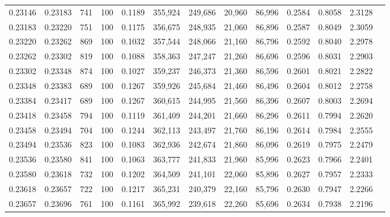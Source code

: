 \begin{tabular}{rrrrrrrrrrrrr}
0.23146 & 0.23183 &   741 & 100 &                                     0.1189 & 355,924 & 249,686 &  20,960 &  86,996 & 0.2584 & 0.8058 & 2.3128 \\
0.23183 & 0.23220 &   751 & 100 &                                     0.1175 & 356,675 & 248,935 &  21,060 &  86,896 & 0.2587 & 0.8049 & 2.3059 \\
0.23220 & 0.23262 &   869 & 100 &                                     0.1032 & 357,544 & 248,066 &  21,160 &  86,796 & 0.2592 & 0.8040 & 2.2978 \\
0.23262 & 0.23302 &   819 & 100 &                                     0.1088 & 358,363 & 247,247 &  21,260 &  86,696 & 0.2596 & 0.8031 & 2.2903 \\
0.23302 & 0.23348 &   874 & 100 &                                     0.1027 & 359,237 & 246,373 &  21,360 &  86,596 & 0.2601 & 0.8021 & 2.2822 \\
0.23348 & 0.23383 &   689 & 100 &                                     0.1267 & 359,926 & 245,684 &  21,460 &  86,496 & 0.2604 & 0.8012 & 2.2758 \\
0.23384 & 0.23417 &   689 & 100 &                                     0.1267 & 360,615 & 244,995 &  21,560 &  86,396 & 0.2607 & 0.8003 & 2.2694 \\
0.23418 & 0.23458 &   794 & 100 &                                     0.1119 & 361,409 & 244,201 &  21,660 &  86,296 & 0.2611 & 0.7994 & 2.2620 \\
0.23458 & 0.23494 &   704 & 100 &                                     0.1244 & 362,113 & 243,497 &  21,760 &  86,196 & 0.2614 & 0.7984 & 2.2555 \\
0.23494 & 0.23536 &   823 & 100 &                                     0.1083 & 362,936 & 242,674 &  21,860 &  86,096 & 0.2619 & 0.7975 & 2.2479 \\
0.23536 & 0.23580 &   841 & 100 &                                     0.1063 & 363,777 & 241,833 &  21,960 &  85,996 & 0.2623 & 0.7966 & 2.2401 \\
0.23580 & 0.23618 &   732 & 100 &                                     0.1202 & 364,509 & 241,101 &  22,060 &  85,896 & 0.2627 & 0.7957 & 2.2333 \\
0.23618 & 0.23657 &   722 & 100 &                                     0.1217 & 365,231 & 240,379 &  22,160 &  85,796 & 0.2630 & 0.7947 & 2.2266 \\
0.23657 & 0.23696 &   761 & 100 &                                     0.1161 & 365,992 & 239,618 &  22,260 &  85,696 & 0.2634 & 0.7938 & 2.2196 \\

\end{tabular}

